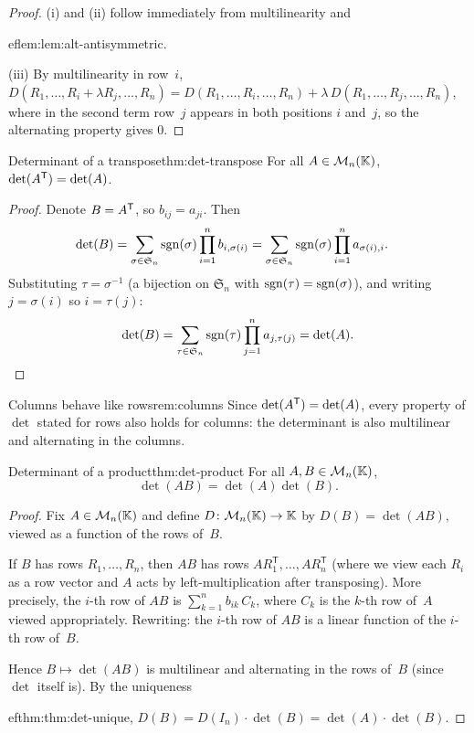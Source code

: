 \begin{proof}
(i) and (ii) follow immediately from multilinearity and

ef{lem:lem:alt-antisymmetric}.

(iii) By multilinearity in row~$i$,
$D(R_1,\ldots,R_i+\lambda R_j,\ldots,R_n)
= D(R_1,\ldots,R_i,\ldots,R_n)
+ \lambda\,D(R_1,\ldots,R_j,\ldots,R_n)$,
where in the second term row~$j$ appears in both positions $i$
and~$j$, so the alternating property gives $0$.
\end{proof}

\begin{theorem}{Determinant of a transpose}{thm:det-transpose}
For all $A\in\mathcal{M}_n({\mathbb{K}})$,
$\det({A}^{\mathsf{T}}) = \det(A)$.
\end{theorem}

\begin{proof}
Denote $B = {A}^{\mathsf{T}}$, so $b_{ij}=a_{ji}$. Then
\begin{align*}
  \det(B) &= \sum_{\sigma\in\mathfrak{S}_n}\operatorname{sgn}(\sigma)
    \prod_{i=1}^n b_{i,\sigma(i)}
  = \sum_{\sigma\in\mathfrak{S}_n}\operatorname{sgn}(\sigma)
    \prod_{i=1}^n a_{\sigma(i),i}.
\end{align*}
Substituting $\tau = \sigma^{-1}$ (a bijection on $\mathfrak{S}_n$
with $\operatorname{sgn}(\tau)=\operatorname{sgn}(\sigma)$), and writing $j=\sigma(i)$
so $i=\tau(j)$:
\[
  \det(B) = \sum_{\tau\in\mathfrak{S}_n}\operatorname{sgn}(\tau)
    \prod_{j=1}^n a_{j,\tau(j)} = \det(A). \qedhere
\]
\end{proof}

\begin{remark}{Columns behave like rows}{rem:columns}
Since $\det({A}^{\mathsf{T}})=\det(A)$, every property of $\det$ stated
for rows also holds for columns: the determinant is also multilinear
and alternating in the columns.
\end{remark}

\begin{theorem}{Determinant of a product}{thm:det-product}
For all $A,B\in\mathcal{M}_n({\mathbb{K}})$,
\[
  \det(AB) = \det(A)\det(B).
\]
\end{theorem}

\begin{proof}
Fix $A\in\mathcal{M}_n({\mathbb{K}})$ and define $D\colon\mathcal{M}_n({\mathbb{K}})\to{\mathbb{K}}$ by
$D(B) = \det(AB)$, viewed as a function of the rows of~$B$.

If $B$ has rows $R_1,\ldots,R_n$, then $AB$ has rows
$AR_1^{\mathsf{T}},\ldots,AR_n^{\mathsf{T}}$ (where we view each
$R_i$ as a row vector and $A$ acts by left-multiplication after
transposing). More precisely, the $i$-th row of $AB$ is
$\sum_{k=1}^n b_{ik}\,C_k$, where $C_k$ is the $k$-th row of~$A$
viewed appropriately. Rewriting: the $i$-th row of $AB$ is a linear
function of the $i$-th row of~$B$.

Hence $B\mapsto\det(AB)$ is multilinear and alternating in the
rows of~$B$ (since $\det$ itself is). By the uniqueness

ef{thm:thm:det-unique},
$D(B) = D(I_n)\cdot\det(B) = \det(A)\cdot\det(B)$.
\end{proof}

